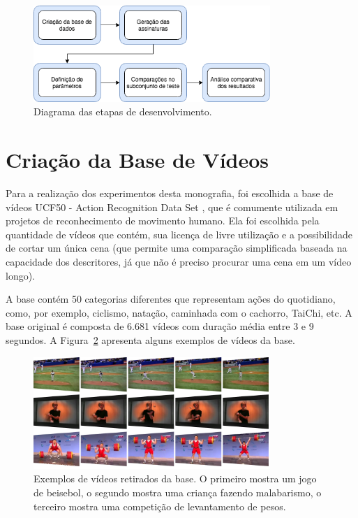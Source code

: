 \begin{figure}[h]
    \centering
    \caption{Diagrama das etapas de desenvolvimento.}
    \label{dia:metodologia}
    \includegraphics[width=0.8\textwidth]{dados/figuras/diagramas/Diag-Metodologia}
\end{figure}

\section{Criação da Base de Vídeos}
\label{sec:database}

Para a realização dos experimentos desta monografia, foi escolhida a base de vídeos UCF50 - Action Recognition Data Set \cite{reddy2013recognizing}, que é comumente utilizada em projetos de reconhecimento de movimento humano. Ela foi escolhida pela quantidade de vídeos que contém, sua licença de livre utilização e a possibilidade de cortar um única cena (que permite uma comparação simplificada baseada na capacidade dos descritores, já que não é preciso procurar uma cena em um vídeo longo).

A base contém 50 categorias diferentes que representam ações do quotidiano, como, por exemplo, ciclismo, natação, caminhada com o cachorro, TaiChi, etc. A base original é composta de 6.681 vídeos com duração média entre 3 e 9 segundos. A Figura~\ref{fig:exemplos} apresenta alguns exemplos de vídeos da base.

\begin{figure}
    \centering
    \caption{Exemplos de vídeos retirados da base. O primeiro mostra um jogo de beisebol, o segundo mostra uma criança fazendo malabarismo, o terceiro mostra uma competição de levantamento de pesos.}
    \label{fig:exemplos}
    \includegraphics[width=0.8\textwidth]{dados/figuras/exemplos}
\end{figure}

